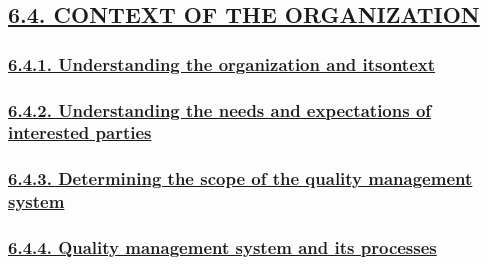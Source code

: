 \documentclass[
]{article}
\begin{document}
\hypertarget{context-of-the-organization}{%
\subsection{\texorpdfstring{\protect\hyperlink{context-of-the-organization-1}{6.4.
CONTEXT OF THE
ORGANIZATION}}{6.4. CONTEXT OF THE ORGANIZATION}}\label{context-of-the-organization}}

\hypertarget{understanding-the-organization-and-itsontext}{%
\subsubsection{\texorpdfstring{\protect\hyperlink{understanding-the-organization-and-itsontext-1}{6.4.1.
Understanding the organization and
itsontext}}{6.4.1. Understanding the organization and itsontext}}\label{understanding-the-organization-and-itsontext}}

\hypertarget{understanding-the-needs-and-expectations-of-interested-parties}{%
\subsubsection{\texorpdfstring{\protect\hyperlink{understanding-the-needs-and-expectations-of-interested-parties-1}{6.4.2.
Understanding the needs and expectations of interested
parties}}{6.4.2. Understanding the needs and expectations of interested parties}}\label{understanding-the-needs-and-expectations-of-interested-parties}}

\hypertarget{determining-the-scope-of-the-quality-management-system}{%
\subsubsection{\texorpdfstring{\protect\hyperlink{determining-the-scope-of-the-quality-management-system-1}{6.4.3.
Determining the scope of the quality management
system}}{6.4.3. Determining the scope of the quality management system}}\label{determining-the-scope-of-the-quality-management-system}}

\hypertarget{quality-management-system-and-its-processes}{%
\subsubsection{\texorpdfstring{\protect\hyperlink{quality-management-system-and-its-processes-1}{6.4.4.
Quality management system and its
processes}}{6.4.4. Quality management system and its processes}}\label{quality-management-system-and-its-processes}}
\end{document}
